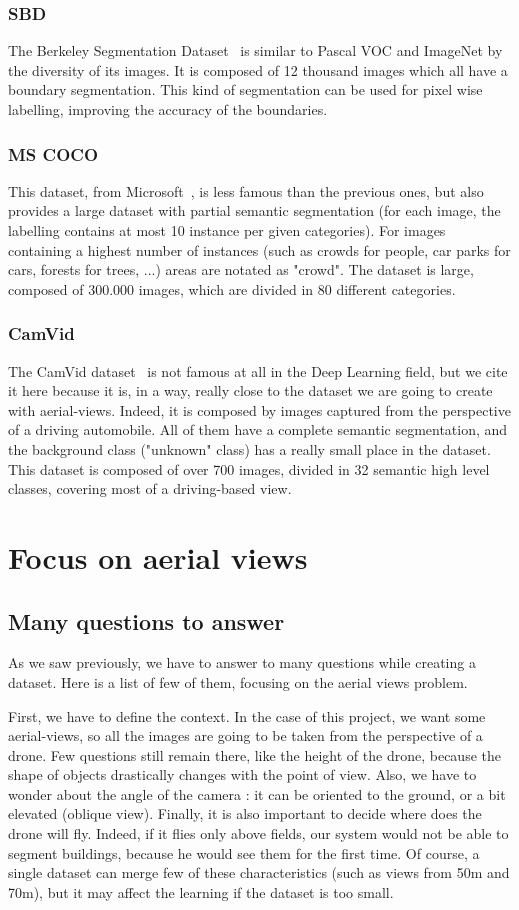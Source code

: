 \subsubsection{SBD} The Berkeley Segmentation Dataset~\cite{MART01} is similar to Pascal VOC and ImageNet by the diversity of its images. It is composed of 12 thousand images which all have a boundary segmentation. This kind of segmentation can be used for pixel wise labelling, improving the accuracy of the boundaries.
\subsubsection{MS COCO} This dataset, from Microsoft~\cite{LIN14}, is less famous than the previous ones, but also provides a large dataset with partial semantic segmentation (for each image, the labelling contains at most 10 instance per given categories). For images containing a highest number of instances (such as crowds for people, car parks for cars, forests for trees, ...) areas are notated as "crowd". The dataset is large, composed of 300.000 images, which are divided in 80 different categories.
\subsubsection{CamVid} The CamVid dataset~\cite{BROS09} is not famous at all in the Deep Learning field, but we cite it here because it is, in a way, really close to the dataset we are going to create with aerial-views. Indeed, it is composed by images captured from the perspective of a driving automobile. All of them have a complete semantic segmentation, and the background class ("unknown" class) has a really small place in the dataset. This dataset is composed of over 700 images, divided in 32 semantic high level classes, covering most of a driving-based view.


\section{Focus on aerial views}
\subsection{Many questions to answer}
As we saw previously, we have to answer to many questions while creating a dataset. Here is a list of few of them, focusing on the aerial views problem.

First, we have to define the context. In the case of this project, we want some aerial-views, so all the images are going to be taken from the perspective of a drone. Few questions still remain there, like the height of the drone, because the shape of objects drastically changes with the point of view. Also, we have to wonder about the angle of the camera : it can be oriented to the ground, or a bit elevated (oblique view). Finally, it is also important to decide where does the drone will fly. Indeed, if it flies only above fields, our system would not be able to segment buildings, because he would see them for the first time. Of course, a single dataset can merge few of these characteristics (such as views from 50m and 70m), but it may affect the learning if the dataset is too small.

